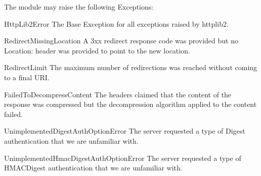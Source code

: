 
The  module may raise the following Exceptions:

\begin{excdesc}{HttpLib2Error}
The Base Exception for all exceptions raised by httplib2.
\end{excdesc}

\begin{excdesc}{RedirectMissingLocation}
A 3xx redirect response code was provided but no Location: header 
was provided to point to the new location.
\end{excdesc}


\begin{excdesc}{RedirectLimit}
The maximum number of redirections was reached without coming to a final URI.
\end{excdesc}


\begin{excdesc}{FailedToDecompressContent}
The headers claimed that the content of the response was compressed but the
decompression algorithm applied to the content failed.
\end{excdesc}


\begin{excdesc}{UnimplementedDigestAuthOptionError}
The server requested a type of Digest authentication that we
are unfamiliar with.
\end{excdesc}

\begin{excdesc}{UnimplementedHmacDigestAuthOptionError}
The server requested a type of HMACDigest authentication that we
are unfamiliar with.
\end{excdesc}

%


